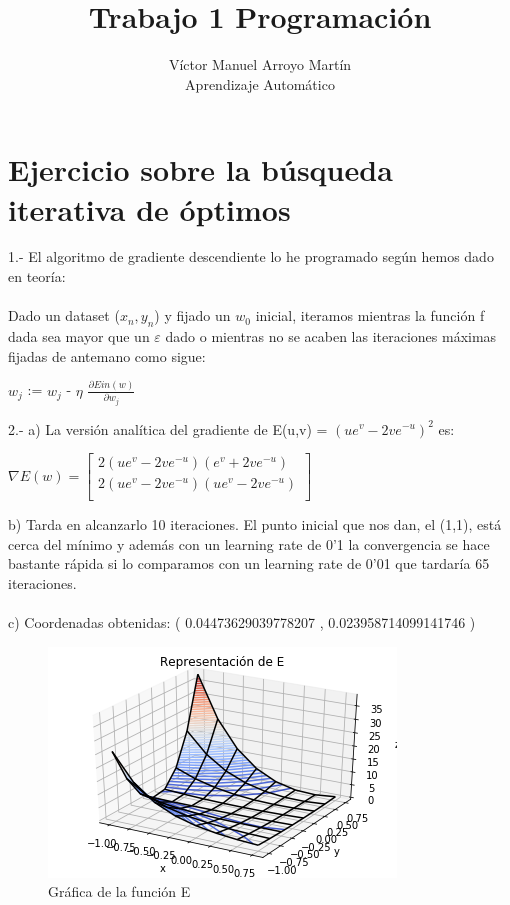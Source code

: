 \documentclass[12pt]{article}
\date{}
\begin{document}
 
\title{Trabajo 1 Programación}
\author{Víctor Manuel Arroyo Martín\\ %
Aprendizaje Automático}

\maketitle
\section{Ejercicio sobre la búsqueda iterativa de óptimos}
1.- El algoritmo de gradiente descendiente lo he programado según hemos dado en teoría:\\\\
Dado un dataset ($x_{n}, y_{n}$) y fijado un $w_{0}$ inicial, iteramos mientras la función f dada sea mayor que un $\varepsilon$ dado o mientras no se acaben las iteraciones máximas fijadas de antemano como sigue: 
\begin{center}
$w_{j}$ := $w_{j}$ - $\eta$ $\frac{\partial Ein(w)}{\partial w_{j}}$ \\
\end{center}
2.- a) La versión analítica del gradiente de E(u,v) = $(ue^{v}-2ve^{-u})^{2}$ es:
\begin{center}
$\nabla E(w)=\begin{bmatrix}
    2(ue^{v} - 2ve^{-u})(e^{v}+2ve^{-u}) \\
    2(ue^{v} - 2ve^{-u})(ue^{v}-2ve^{-u}) \\
\end{bmatrix}$
\end{center}
b) Tarda en alcanzarlo 10 iteraciones. El punto inicial que nos dan, el (1,1), está cerca del mínimo y además con un learning rate de 0'1 la convergencia se hace bastante rápida si lo comparamos con un learning rate de 0'01 que tardaría 65 iteraciones.\\\\
c) Coordenadas obtenidas: ( 0.04473629039778207 ,  0.023958714099141746 )
\begin{figure}[h]
\centering
\includegraphics[scale=0.75]{Images/GraficaE1.png} 
\caption{Gráfica de la función E}
\label{etiqueta}
\end{figure}
\end{document}
